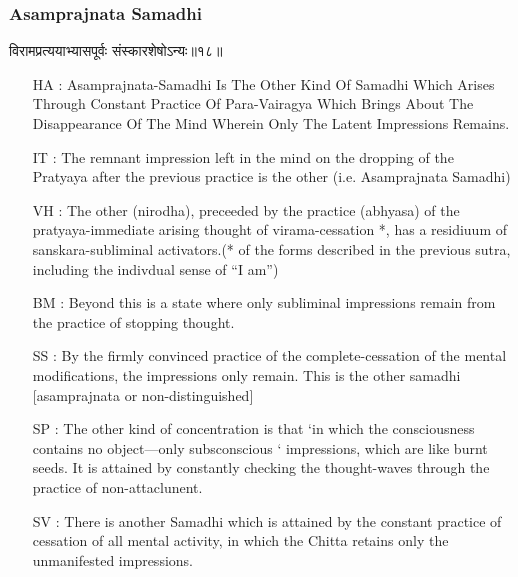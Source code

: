 \begin{frame}[fragile]\frametitle{Asamprajnata Samadhi}
\begin{sanskrit}
विरामप्रत्ययाभ्यासपूर्वः संस्कारशेषोऽन्यः॥१८॥
\end{sanskrit}

	\begin{itemize}
	\item [HA]: Asamprajnata-Samadhi Is The Other Kind Of Samadhi Which Arises Through Constant Practice Of Para-Vairagya Which Brings About The Disappearance Of The Mind Wherein Only The Latent Impressions Remains.
	\item [IT]: The remnant impression left in the mind on the dropping of the Pratyaya after the previous practice is the other (i.e. Asamprajnata Samadhi)
	\item [VH]: The other (nirodha), preceeded by the practice (abhyasa) of the pratyaya-immediate arising thought of virama-cessation *, has a residiuum of sanskara-subliminal activators.(* of the forms described in the previous sutra, including the indivdual sense of “I am”)
	\item [BM]: Beyond this is a state where only subliminal impressions remain from the practice of stopping thought.
	\item [SS]: By the firmly convinced practice of the complete-cessation of the mental modifications, the impressions only remain. This is the other samadhi [asamprajnata or non-distinguished]
	\item [SP]: The other kind of concentration is that ‘in which the consciousness contains no object—only subsconscious ‘ impressions, which are like burnt seeds. It is attained by constantly checking the thought-waves through the practice of non-attaclunent.
	\item [SV]: There is another Samadhi which is attained by the constant practice of cessation of all mental activity, in which the Chitta retains only the unmanifested impressions. 
	\end{itemize}
\end{frame}


